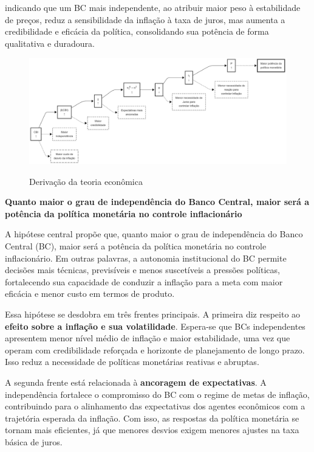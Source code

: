 \documentclass[a4paper,12pt]{article}
\begin{document}
\noindent indicando que um BC mais independente, ao atribuir maior peso à estabilidade de preços, reduz a sensibilidade da inflação à taxa de juros, mas aumenta a credibilidade e eficácia da política, consolidando sua potência de forma qualitativa e duradoura.

\begin{figure}[H]
    \centering
    \caption{Derivação da teoria econômica}
    \includegraphics[width=.85\linewidth]{Imagens/paperi3.png}
    \label{fig:intuição_econômica}
\end{figure}

\begin{center}
\vspace{0.5em}
\textbf{\Large Quanto maior o grau de independência do Banco Central, maior será a potência da política monetária no controle inflacionário}
\vspace{0.5em}
\end{center}

A hipótese central propõe que, quanto maior o grau de independência do Banco Central (BC), maior será a potência da política monetária no controle inflacionário. Em outras palavras, a autonomia institucional do BC permite decisões mais técnicas, previsíveis e menos suscetíveis a pressões políticas, fortalecendo sua capacidade de conduzir a inflação para a meta com maior eficácia e menor custo em termos de produto.

Essa hipótese se desdobra em três frentes principais. A primeira diz respeito ao \textbf{efeito sobre a inflação e sua volatilidade}. Espera-se que BCs independentes apresentem menor nível médio de inflação e maior estabilidade, uma vez que operam com credibilidade reforçada e horizonte de planejamento de longo prazo. Isso reduz a necessidade de políticas monetárias reativas e abruptas.

A segunda frente está relacionada à \textbf{ancoragem de expectativas}. A independência fortalece o compromisso do BC com o regime de metas de inflação, contribuindo para o alinhamento das expectativas dos agentes econômicos com a trajetória esperada da inflação. Com isso, as respostas da política monetária se tornam mais eficientes, já que menores desvios exigem menores ajustes na taxa básica de juros.
\end{document}
